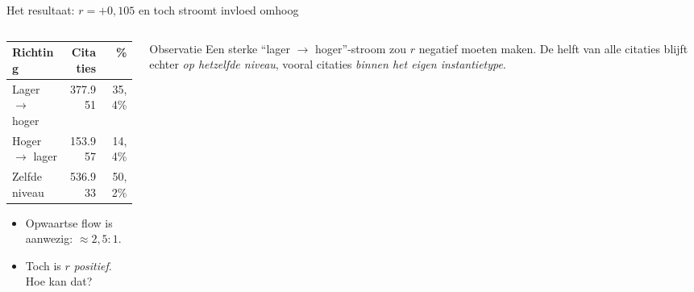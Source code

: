 \documentclass[aspectratio=169,11pt]{beamer}
\newcommand{\rd}[1]{\textcolor{uvared}{#1}}
\begin{document}
\begin{frame}{Het resultaat: $r=+0{,}105$ en toch stroomt invloed omhoog}
  \footnotesize
  \begin{columns}[T]
    \begin{column}{0.5\textwidth}
      \begin{table}
        \centering\renewcommand{\arraystretch}{1.25}
        \begin{tabular}{@{}lrr@{}}
          \toprule
          Richting & Citaties & \% \\
          \midrule
          Lager $\to$ hoger & 377.951 & 35,4\% \\
          Hoger $\to$ lager & 153.957 & 14,4\% \\
          Zelfde niveau & 536.933 & 50,2\% \\
          \bottomrule
        \end{tabular}
      \end{table}
      \vspace{0.4em}
      \begin{itemize}
        \item Opwaartse flow \rd{is} aanwezig: $\approx 2{,}5:1$.
        \item Toch is $r$ \emph{positief}. Hoe kan dat?
      \end{itemize}
    \end{column}
    \begin{column}{0.5\textwidth}
      \begin{block}{Observatie}
        Een sterke ``lager $\to$ hoger''-stroom zou $r$ \rd{negatief} moeten maken. De helft van alle citaties blijft echter \emph{op hetzelfde niveau}, vooral citaties \emph{binnen het eigen instantietype}.
      \end{block}
    \end{column}
  \end{columns}
\end{frame}
\end{document}
